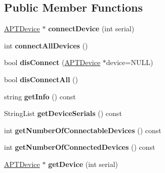 \subsection*{Public Member Functions}
\begin{DoxyCompactItemize}
\item 
\hyperlink{class_a_p_t_device}{A\+P\+T\+Device} $\ast$ {\bfseries connect\+Device} (int serial)\hypertarget{class_device_manager_ac0ce1a37822574594eb65f02465d2c00}{}\label{class_device_manager_ac0ce1a37822574594eb65f02465d2c00}

\item 
int {\bfseries connect\+All\+Devices} ()\hypertarget{class_device_manager_a44bad7c44e967d498b4aa44d2d99ba61}{}\label{class_device_manager_a44bad7c44e967d498b4aa44d2d99ba61}

\item 
bool {\bfseries dis\+Connect} (\hyperlink{class_a_p_t_device}{A\+P\+T\+Device} $\ast$device=N\+U\+LL)\hypertarget{class_device_manager_aae705d733108941034673f80669d05b8}{}\label{class_device_manager_aae705d733108941034673f80669d05b8}

\item 
bool {\bfseries dis\+Connect\+All} ()\hypertarget{class_device_manager_a6cdff3988b15f8ccfa857c723ea94d31}{}\label{class_device_manager_a6cdff3988b15f8ccfa857c723ea94d31}

\item 
string {\bfseries get\+Info} () const \hypertarget{class_device_manager_ad614cb5000d81785ae831b27aaa6d887}{}\label{class_device_manager_ad614cb5000d81785ae831b27aaa6d887}

\item 
String\+List {\bfseries get\+Device\+Serials} () const \hypertarget{class_device_manager_ad8757315554fabd3f1dcb852be6094a6}{}\label{class_device_manager_ad8757315554fabd3f1dcb852be6094a6}

\item 
int {\bfseries get\+Number\+Of\+Connectable\+Devices} () const \hypertarget{class_device_manager_a41df406e20602c881d1c1cd2c80bdb4e}{}\label{class_device_manager_a41df406e20602c881d1c1cd2c80bdb4e}

\item 
int {\bfseries get\+Number\+Of\+Connected\+Devices} () const \hypertarget{class_device_manager_aa1504b362aaac787513d2b2bfabcaa86}{}\label{class_device_manager_aa1504b362aaac787513d2b2bfabcaa86}

\item 
\hyperlink{class_a_p_t_device}{A\+P\+T\+Device} $\ast$ {\bfseries get\+Device} (int serial)\hypertarget{class_device_manager_a6afa6667cca657ed2527a9e3c46df3d3}{}\label{class_device_manager_a6afa6667cca657ed2527a9e3c46df3d3}


\end{DoxyCompactItemize}
